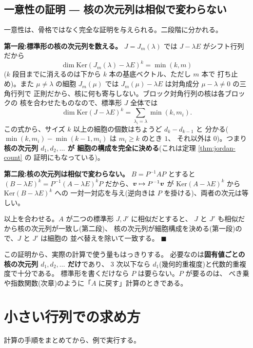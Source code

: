 \subsection*{一意性の証明 ― 核の次元列は相似で変わらない}

一意性は、骨格ではなく完全な証明を与えられる。二段階に分かれる。

\noindent\textbf{第一段:標準形の核の次元列を数える。}\quad
$J = J_m(\lambda)$ では $J - \lambda E$ がシフト行列だから
\[
\dim \mathrm{Ker}(J_m(\lambda) - \lambda E)^k = \min(k, m)
\]
($k$ 段目までに消えるのは下から $k$ 本の基底ベクトル、ただし $m$ 本で
打ち止め)。また $\mu \neq \lambda$ の細胞 $J_m(\mu)$ では
$J_m(\mu) - \lambda E$ は対角成分 $\mu - \lambda \neq 0$ の三角行列で
正則だから、核に何も寄与しない。ブロック対角行列の核は各ブロックの
核を合わせたものなので、標準形 $J$ 全体では
\[
\dim \mathrm{Ker}(J - \lambda E)^k
= \sum_{\lambda_i = \lambda} \min(k, m_i).
\]
この式から、サイズ $k$ 以上の細胞の個数はちょうど $d_k - d_{k-1}$ と
分かる($\min(k, m_i) - \min(k-1, m_i)$ は $m_i \ge k$ のとき $1$、
それ以外は $0$)。つまり\textbf{核の次元列 $d_1, d_2, \dots$ が
細胞の構成を完全に決める}(これは定理 \ref{thm:jordan-count} の
証明にもなっている)。

\noindent\textbf{第二段:核の次元列は相似で変わらない。}\quad
$B = P^{-1}AP$ とすると $(B - \lambda E)^k = P^{-1}(A - \lambda E)^k P$
だから、$\bm{v} \mapsto P^{-1}\bm{v}$ が
$\mathrm{Ker}(A - \lambda E)^k$ から $\mathrm{Ker}(B - \lambda E)^k$ への
一対一対応を与え(逆向きは $P$ を掛ける)、両者の次元は等しい。

以上を合わせる。$A$ が二つの標準形 $J, J'$ に相似だとすると、
$J$ と $J'$ も相似だから核の次元列が一致し(第二段)、
核の次元列が細胞構成を決める(第一段)ので、$J$ と $J'$ は細胞の
並べ替えを除いて一致する。 $\blacksquare$

\begin{chui}
この証明から、実際の計算で使う量もはっきりする。
必要なのは\textbf{固有値ごとの核の次元列 $d_1, d_2, \dots$ だけ}であり、
$3$ 次以下なら $d_1$(幾何的重複度)と代数的重複度で十分である。
標準形を書くだけなら $P$ は要らない。$P$ が要るのは、
べき乗や指数関数(次章)のように「$A$ に戻す」計算のときである。
\end{chui}

\section{小さい行列での求め方}

計算の手順をまとめてから、例で実行する。

